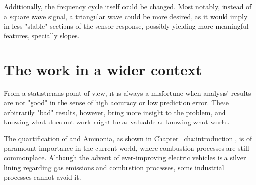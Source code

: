 Additionally, the frequency cycle itself could be changed. Most notably, instead of a square wave signal, a triangular wave could be more desired, as it would imply in less "stable" sections of the sensor response, possibly yielding more meaningful features, specially slopes.

\section{The work in a wider context}
\label{sec:work-wider-context}

From a statisticians point of view, it is always a misfortune when analysis' results are not "good" in the sense of high accuracy or low prediction error. These arbitrarily "bad" results, however, bring more insight to the problem, and knowing what does not work might be as valuable as knowing what works.

The quantification of \nox and Ammonia, as shown in Chapter~\ref{cha:introduction}, is of paramount importance in the current world, where combustion processes are still commonplace. Although the advent of ever-improving electric vehicles is a silver lining regarding gas emissions and combustion processes, some industrial processes cannot avoid it. 


